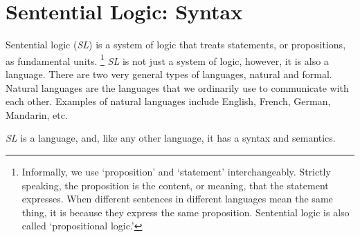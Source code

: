 \documentclass[../logic-text.tex]{subfiles}
\begin{document}
\chapter{Sentential Logic: Syntax}
\label{cha:sent-logic:-synt}

Sentential logic ({\em SL}) is a system of logic that treats statements, or propositions, as fundamental units.
\footnote{Informally, we use `proposition' and `statement' interchangeably.
  Strictly speaking, the proposition is the content, or meaning, that the statement expresses.
  When different sentences in different languages mean the same thing, it is because they express the same proposition.
  Sentential logic is also called \enquote*{propositional logic.}}
\emph{SL} is not just a system of logic, however, it is also a language. There are two very general types of languages, natural and formal. Natural languages are the languages that we ordinarily use to communicate with each other. Examples of natural languages include English, French, German, Mandarin, etc. 

\emph{SL} is a language, and, like any other language, it has a syntax and semantics. 
\end{document}
